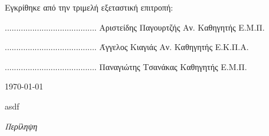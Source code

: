 \documentclass[
11pt, %
english, %
singlespacing, %
parskip, %
headsepline, %
]{MastersDoctoralThesis} %
\begin{document}
\begin{center}
\noindent
\small
Εγκρίθηκε από την τριμελή εξεταστική επιτροπή:

\vfill

\begin{center}
\scriptsize
\parbox[b]{0.3\textwidth} {\center
	........................................
	Αριστείδης Παγουρτζής
	Αν. Καθηγητής Ε.Μ.Π.
}
\parbox[b]{0.3\textwidth} {\center
	........................................
	Άγγελος Κιαγιάς
	Αν. Καθηγητής Ε.Κ.Π.Α.
}
\parbox[b]{0.3\textwidth} {\center
	........................................
	Παναγιώτης Τσανάκας
	Καθηγητής Ε.Μ.Π.
}
\end{center}


\vfill
{\large \today}\\[4cm] %

\end{center}


\pagebreak

asdf

\pagebreak






\thispagestyle{plain}
\begin{center}
  {\huge\textit{Περίληψη} \par}
  \bigskip
\end{center}
\end{document}
